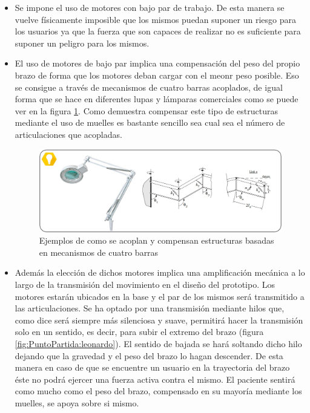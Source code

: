 \begin{itemize}
    \item Se impone el uso de motores con bajo par de trabajo. De esta manera se vuelve físicamente imposible que los mismos puedan suponer un riesgo para los usuarios ya que la fuerza que son capaces de realizar no es suficiente para suponer un peligro para los mismos.
    \item El uso de motores de bajo par implica una compensación del peso del propio brazo de forma que los motores deban cargar con el meonr peso posible. Eso se consigue a través de mecanismos de cuatro barras acoplados, de igual forma que se hace en diferentes lupas y lámparas comerciales como se puede ver en la figura \ref{fig:PuntoPartida:CuatroBarras}. Como demuestra \cite{Rahman_asimple} compensar este tipo de estructuras mediante el uso de muelles es bastante sencillo sea cual sea el número de articulaciones que acopladas.
    \begin{figure}
    	\centering
    	\includegraphics[width=1\textwidth]{figuras/Imagenes_PuntoPartida/CuatroBarras.jpg}
    	\caption{Ejemplos de como se acoplan y compensan estructuras basadas en mecanismos de cuatro barras}
    	\label{fig:PuntoPartida:CuatroBarras}
    \end{figure}
    \item Además la elección de dichos motores implica una amplificación mecánica a lo largo de la transmisión del movimiento en el diseño del prototipo. Los motores estarán ubicados en la base y el par de los mismos será transmitido a las articulaciones. Se ha optado por una transmisión mediante hilos que, como dice \cite{LeonardoCodice} será siempre más silenciosa y suave, permitirá hacer la transmisión solo en un sentido, es decir, para subir el extremo del brazo (figura \ref{fig:PuntoPartida:leonardo}). El sentido de bajada se hará soltando dicho hilo dejando que la gravedad y el peso del brazo lo hagan descender. De esta manera en caso de que se encuentre un usuario en la trayectoria del brazo éste no podrá ejercer una fuerza activa contra el mismo. El paciente sentirá como mucho como el peso del brazo, compensado en su mayoría mediante los muelles, se apoya sobre si mismo.

\end{itemize}
